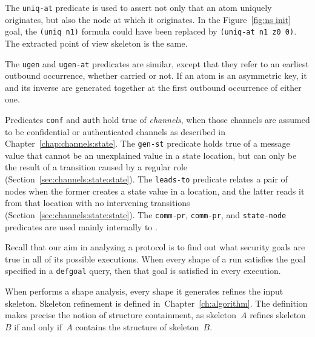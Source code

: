 The \texttt{uniq-at} predicate is used to assert not only that an atom
uniquely originates, but also the node at which it originates.  In the
Figure~\ref{fig:ns init} goal, the \texttt{(uniq n1)} formula could
have been replaced by \texttt{(uniq-at n1 z0 0)}.  The extracted point
of view skeleton is the same.

The \texttt{ugen} and \texttt{ugen-at} predicates are similar, except
that they refer to an earliest outbound occurrence, whether carried or
not.  If an atom is an asymmetric key, it and its inverse are
generated together at the first outbound occurrence of either one.

Predicates \texttt{conf} and \texttt{auth} hold true of
\emph{channels}, when those channels are assumed to be confidential or
authenticated channels as described in
Chapter~\ref{chap:channels:state}.  The \texttt{gen-st} predicate
holds true of a message value that cannot be an unexplained value in a
state location, but can only be the result of a transition caused by a
regular role (Section~\ref{sec:channels:state:state}).  The
\texttt{leads-to} predicate relates a pair of nodes when the former
creates a state value in a location, and the latter reads it from that
location with no intervening transitions
(Section~\ref{sec:channels:state:state}).  The \texttt{comm-pr},
\texttt{comm-pr}, and \texttt{state-node} predicates are used mainly
internally to {\cpsa}.   

Recall that our aim in analyzing a protocol is to find out what
security goals are true in all of its possible executions. When every
shape of a {\cpsa} run satisfies the goal specified in a
\texttt{defgoal} query, then that goal is satisfied in every
execution. 

When {\cpsa} performs a shape analysis, every shape it generates
refines the input skeleton.  Skeleton refinement is defined
in~Chapter~\ref{ch:algorithm}.  The definition makes precise the
notion of structure containment, as skeleton~$A$ refines skeleton~$B$
if and only if~$A$ contains the structure of skeleton~$B$.

